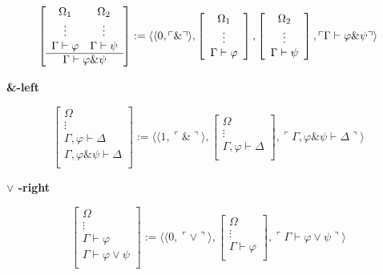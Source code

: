 $$
\left [
\begin{array}{cc}
\Omega_1 & \Omega_{2} \\
\vdots & \vdots\\
\Gamma \vdash \varphi & \Gamma \vdash \psi\\
\hline
\multicolumn{2}{c}{\Gamma \vdash \varphi \& \psi}\\
\end{array}
\right ]
:= \langle \langle 0,\ulcorner \& \urcorner \rangle ,
\left [
\begin{array}{c}
\Omega_1\\
\vdots\\
\Gamma \vdash \varphi\\
\end{array}
\right ],
\left [
\begin{array}{c}
\Omega_2\\
\vdots\\
\Gamma \vdash \psi\\
\end{array}
\right],
\ulcorner \Gamma \vdash \varphi \& \psi \urcorner \rangle
$$

\vspace{0,5cm}

\textbf{\&-left}

$$
\left [
\begin{array}{c}
\Omega\\
\vdots\\
\Gamma, \varphi \vdash \Delta\\
\hline
\Gamma, \varphi \& \psi \vdash \Delta\\
\end{array}
\right ]
:= \langle \langle 1,\ulcorner \& \urcorner \rangle ,
\left [
\begin{array}{c}
\Omega\\
\vdots\\
\Gamma, \varphi \vdash \Delta\\
\end{array}
\right ],
\ulcorner \Gamma, \varphi \& \psi \vdash \Delta \urcorner \rangle
$$

\vspace{0.5cm}

\textbf{$\vee$ -right}

$$
\left [
\begin{array}{c}
\Omega\\
\vdots\\
\Gamma \vdash \varphi\\
\hline
\Gamma \vdash \varphi \vee \psi\\
\end{array}
\right ]
:= \langle \langle 0,\ulcorner \vee \urcorner \rangle ,
\left [
\begin{array}{c}
\Omega\\
\vdots\\
\Gamma \vdash \varphi\\
\end{array}
\right ],
\ulcorner \Gamma \vdash \varphi \vee \psi \urcorner \rangle
$$

